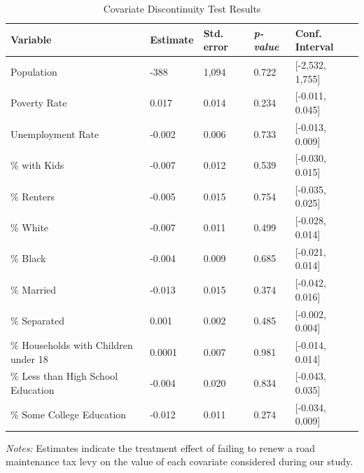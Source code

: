 \begin{table}[!h]
    \centering
    \caption{Covariate Discontinuity Test Results}
    \label{tab:covariate_discontinuity}
    \begin{tabularx}{\textwidth}{p{4cm}*{3}{X}X}
          \hline
          Variable & Estimate & Std. error & \textit{p-value} & Conf. Interval \\
          \hline
          \renewcommand{\arraystretch}{1.5}
        Population                           & -388      & 1,094   & 0.722  & [-2,532, 1,755] \\
        Poverty Rate                         & 0.017     & 0.014   & 0.234  & [-0.011, 0.045] \\
        Unemployment Rate                 & -0.002    & 0.006   & 0.733  & [-0.013, 0.009] \\
        \% with Kids                         & -0.007    & 0.012   & 0.539  & [-0.030, 0.015] \\
        \% Renters                           & -0.005    & 0.015   & 0.754  & [-0.035, 0.025] \\
        \% White                             & -0.007    & 0.011   & 0.499  & [-0.028, 0.014] \\
        \% Black                             & -0.004    & 0.009   & 0.685  & [-0.021, 0.014] \\
        \% Married                           & -0.013    & 0.015   & 0.374  & [-0.042, 0.016] \\
        \% Separated                         & 0.001     & 0.002   & 0.485  & [-0.002, 0.004] \\
        \% Households with Children under 18 & 0.0001    & 0.007   & 0.981  & [-0.014, 0.014] \\
        \% Less than High School Education   & -0.004    & 0.020   & 0.834  & [-0.043, 0.035] \\
        \% Some College Education            & -0.012    & 0.011   & 0.274  & [-0.034, 0.009] \\
        \hline
    \end{tabularx}
    \begin{tablenotes}
        \small
        \item \textit{Notes:} Estimates indicate the treatment effect of failing to renew a road maintenance tax levy on the value of each covariate considered during our study. 
    \end{tablenotes}
\end{table}

